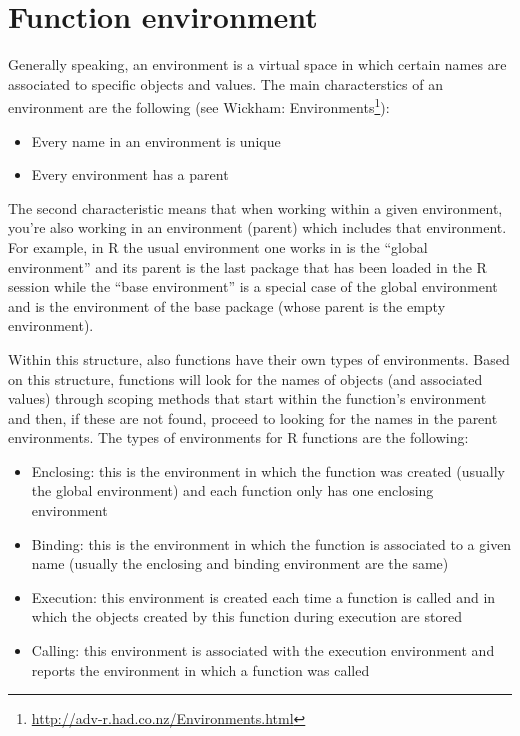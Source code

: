 \documentclass[12pt,]{krantz}
\providecommand{\tightlist}{%
  \setlength{\itemsep}{0pt}\setlength{\parskip}{0pt}}
\renewcommand{\href}[2]{#2\footnote{\url{#1}}}
\begin{document}
\section{Function environment}\label{function-environment}

Generally speaking, an environment is a virtual space in which certain
names are associated to specific objects and values. The main
characterstics of an environment are the following (see
\href{http://adv-r.had.co.nz/Environments.html}{Wickham: Environments}):

\begin{itemize}
\tightlist
\item
  Every name in an environment is unique
\item
  Every environment has a parent
\end{itemize}

The second characteristic means that when working within a given
environment, you're also working in an environment (parent) which
includes that environment. For example, in R the usual environment one
works in is the ``global environment'' and its parent is the last
package that has been loaded in the R session while the ``base
environment'' is a special case of the global environment and is the
environment of the base package (whose parent is the empty environment).

Within this structure, also functions have their own types of
environments. Based on this structure, functions will look for the names
of objects (and associated values) through scoping methods that start
within the function's environment and then, if these are not found,
proceed to looking for the names in the parent environments. The types
of environments for R functions are the following:

\begin{itemize}
\tightlist
\item
  Enclosing: this is the environment in which the function was created
  (usually the global environment) and each function only has one
  enclosing environment
\item
  Binding: this is the environment in which the function is associated
  to a given name (usually the enclosing and binding environment are the
  same)
\item
  Execution: this environment is created each time a function is called
  and in which the objects created by this function during execution are
  stored
\item
  Calling: this environment is associated with the execution environment
  and reports the environment in which a function was called
\end{itemize}
\end{document}
